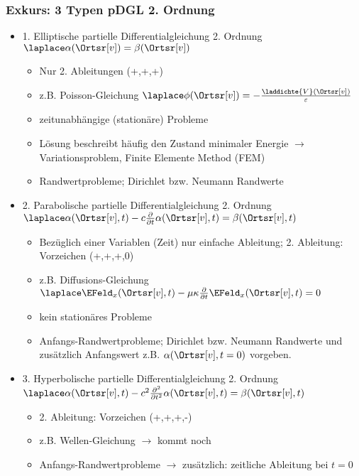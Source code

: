 \begin{frame}
  \frametitle{Exkurs: 3 Typen pDGL 2. Ordnung}
  \begin{itemize}[<+->]
  \item \alert{1. Elliptische partielle Differentialgleichung 2. Ordnung} $\laplace \alpha(\Ortsr[v]) = \beta(\Ortsr[v])$
    \begin{itemize}[<+->]
      \item Nur 2. Ableitungen (+,+,+)
    \item z.B. Poisson-Gleichung $\laplace\phi(\Ortsr[v])=-\frac{\laddichte{V}(\Ortsr[v])}{\varepsilon}$
  \item zeitunabhängige (stationäre) Probleme
  \item Lösung beschreibt häufig den Zustand \alert{minimaler Energie} $\to$ Variationsproblem, Finite Elemente Method (FEM) 
    \item \alert{Randwert}probleme; Dirichlet bzw. Neumann Randwerte
  \end{itemize}

\item \alert{2. Parabolische partielle Differentialgleichung 2. Ordnung} $\laplace \alpha(\Ortsr[v], t) - c\frac{\partial}{\partial t}\alpha(\Ortsr[v], t) = \beta(\Ortsr[v], t)$
  \begin{itemize}[<+->]
    \item Bezüglich einer Variablen (Zeit) nur einfache Ableitung; 2. Ableitung: Vorzeichen (+,+,+,0)
    \item z.B. Diffusions-Gleichung $\laplace \EFeld_x(\Ortsr[v], t) -\mu\kappa \frac{\partial}{\partial t} \EFeld_x(\Ortsr[v], t) = 0$
  \item kein stationäres Probleme
    \item \alert{Anfangs-Randwert}probleme; Dirichlet bzw. Neumann Randwerte und zusätzlich Anfangswert z.B. $\alpha(\Ortsr[v], t=0)$ vorgeben.
  \end{itemize}

\item \alert{3. Hyperbolische partielle Differentialgleichung 2. Ordnung} $\laplace \alpha(\Ortsr[v], t) - c^2\frac{\partial^2}{\partial t^2}\alpha(\Ortsr[v], t) = \beta(\Ortsr[v], t)$
  \begin{itemize}[<+->]
    \item 2. Ableitung: Vorzeichen (+,+,+,-)
    \item z.B. Wellen-Gleichung $\to$ \alert{kommt noch}
    \item \alert{Anfangs-Randwert}probleme $\to$ \alert{zusätzlich:} zeitliche Ableitung bei $t=0$
  \end{itemize}
  
\end{itemize}
\end{frame}


   
